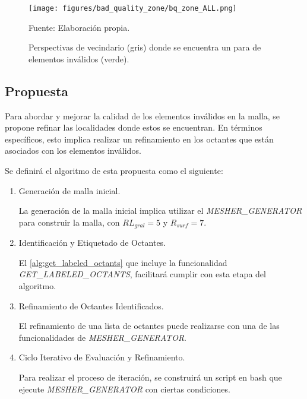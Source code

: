 \begin{figure}[!ht]
    \centering
    \texttt{[image: figures/bad\_quality\_zone/bq\_zone\_ALL.png]}
    \caption{ Perspectivas de vecindario (gris) donde se encuentra un para de elementos inválidos (verde). }
    Fuente: Elaboración propia.
    \label{fig:zoom_cortex_surf_all}
\end{figure}


\subsection{Propuesta}

Para abordar y mejorar la calidad de los elementos inválidos en la malla, se propone refinar las localidades donde estos se encuentran. En términos específicos, esto implica realizar un refinamiento en los octantes que están asociados con los elementos inválidos.




Se definirá el algoritmo de esta propuesta como el siguiente:

\begin{enumerate}
    \item Generación de malla inicial.
    
        La generación de la malla inicial implica utilizar el \textit{MESHER\_GENERATOR} para construir la malla, con $RL_{gral} = 5$ y $R_{surf} = 7$. 
    \item Identificación y Etiquetado de Octantes.
        
        El \autoref{alg:get_labeled_octants} que incluye la funcionalidad \textit{GET\_LABELED\_OCTANTS}, facilitará cumplir con esta etapa del algoritmo.
    \item Refinamiento de Octantes Identificados.
        
        El refinamiento de una lista de octantes puede realizarse con una de las funcionalidades de \textit{MESHER\_GENERATOR}.
    \item Ciclo Iterativo de Evaluación y Refinamiento.
        
        Para realizar el proceso de iteración, se construirá un script en bash que ejecute \textit{MESHER\_GENERATOR} con ciertas condiciones.
\end{enumerate}

